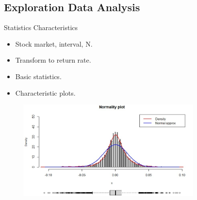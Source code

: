 \documentclass{beamer}
\begin{document}
\subsection{Exploration Data Analysis}
\begin{frame}{Statistics Characteristics}
  \begin{itemize}
    \item Stock market, interval, N.
    \item Transform to return rate.
    \item Basic statistics.
    \item Characteristic plots.
  \end{itemize}


  \begin{figure}[htp]
    \centering
    \hypertarget{Leptokurtosis}{\includegraphics[height = 5cm]{fig/Normality_plot.jpg}}
  \end{figure}
\end{frame}
\end{document}

